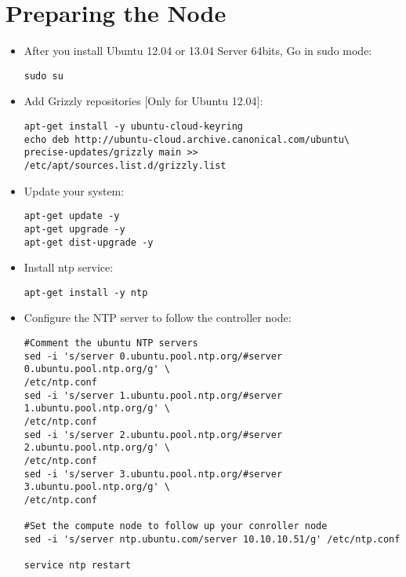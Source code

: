 \section{Preparing the Node}
\label{preparingthenode}

\begin{itemize}
\item After you install Ubuntu 12.04 or 13.04 Server 64bits, Go in sudo mode:

\begin{verbatim}
sudo su
\end{verbatim}


\item Add Grizzly repositories [Only for Ubuntu 12.04]:

\begin{verbatim}
apt-get install -y ubuntu-cloud-keyring 
echo deb http://ubuntu-cloud.archive.canonical.com/ubuntu\
precise-updates/grizzly main >> /etc/apt/sources.list.d/grizzly.list
\end{verbatim}


\item Update your system:

\begin{verbatim}
apt-get update -y
apt-get upgrade -y
apt-get dist-upgrade -y
\end{verbatim}


\item Install ntp service:

\begin{verbatim}
apt-get install -y ntp
\end{verbatim}


\item Configure the NTP server to follow the controller node:

\begin{verbatim}
#Comment the ubuntu NTP servers
sed -i 's/server 0.ubuntu.pool.ntp.org/#server 0.ubuntu.pool.ntp.org/g' \ 
/etc/ntp.conf
sed -i 's/server 1.ubuntu.pool.ntp.org/#server 1.ubuntu.pool.ntp.org/g' \
/etc/ntp.conf
sed -i 's/server 2.ubuntu.pool.ntp.org/#server 2.ubuntu.pool.ntp.org/g' \
/etc/ntp.conf
sed -i 's/server 3.ubuntu.pool.ntp.org/#server 3.ubuntu.pool.ntp.org/g' \
/etc/ntp.conf

#Set the compute node to follow up your conroller node
sed -i 's/server ntp.ubuntu.com/server 10.10.10.51/g' /etc/ntp.conf

service ntp restart  
\end{verbatim}



\end{itemize}

